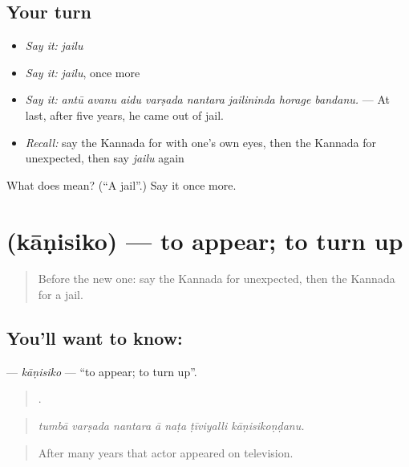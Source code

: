\subsection*{Your turn}
\begin{itemize}
\raggedright
  \item \emph{Say it:} \emph{jailu}
  \item \emph{Say it:} \emph{jailu}, once more
  \item \emph{Say it:} \emph{antū avanu aidu varṣada nantara jailininda horage bandanu.} — At last, after five years, he came out of jail.
  \item \emph{Recall:} say the Kannada for with one's own eyes, then the Kannada for unexpected, then say \emph{jailu} again
\end{itemize}

\begin{tcolorbox}[breakable,colback=teal!4,colframe=teal!35!black,title={Before you move on}]
What does  mean? (\textquotedblleft{}A jail\textquotedblright{}.) Say it once more.
\end{tcolorbox}
\section[\texorpdfstring{\kn{ಕಾಣಿಸಿಕೊ} (kāṇisiko)}{ಕಾಣಿಸಿಕೊ (kāṇisiko)}]{ (kāṇisiko) — to appear; to turn up}

\label{lesson:KA-C369-kanisiko}



\begin{quote}
Before the new one: say the Kannada for unexpected, then the Kannada for a jail.
\end{quote}

\subsection*{You'll want to know: }
\textbf{} — \emph{kāṇisiko} — \textquotedblleft{}to appear; to turn up\textquotedblright{}.

\begin{quote}
      .
\end{quote}

\begin{quote}
\emph{tumbā varṣada nantara ā naṭa ṭīviyalli kāṇisikoṇḍanu.}
\end{quote}

\begin{quote}
After many years that actor appeared on television.
\end{quote}

